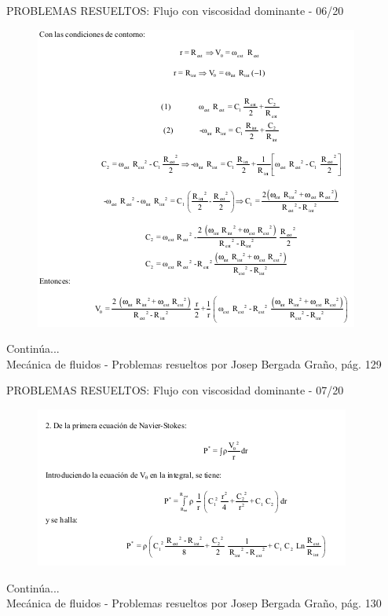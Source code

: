 \begin{frame}{PROBLEMAS RESUELTOS: Flujo con viscosidad dominante - 06/20}
\justifying
\begin{figure}[H]
\centering
\includegraphics[scale=0.4]{Section_Files/S2-imagenes-Jhon/Book-ProbResuelts/P35-E06.png}
\end{figure}
Continúa...\\
{\tiny Mecánica de fluidos - Problemas resueltos por Josep Bergada Graño, pág. 129}
\end{frame}

\begin{frame}{PROBLEMAS RESUELTOS: Flujo con viscosidad dominante - 07/20}
\justifying
\begin{figure}[H]
\centering
\includegraphics[scale=0.5]{Section_Files/S2-imagenes-Jhon/Book-ProbResuelts/P35-E07.png}
\end{figure}
Continúa...\\
{\tiny Mecánica de fluidos - Problemas resueltos por Josep Bergada Graño, pág. 130}
\end{frame}


